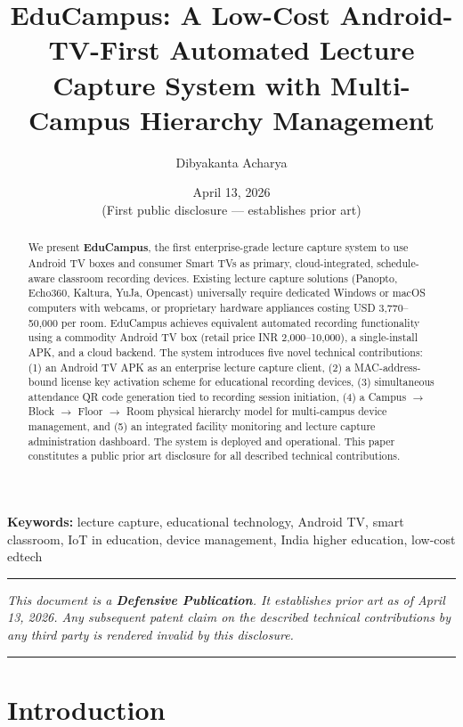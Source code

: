 \documentclass[12pt,a4paper]{article}
\title{\textbf{EduCampus: A Low-Cost Android-TV-First Automated Lecture Capture System with Multi-Campus Hierarchy Management}}
\author[1]{Dibyakanta Acharya}
\affil[1]{D\&R AI Solutions Pvt.\ Ltd., India \\
\texttt{founder@drandsolutions.in}}
\date{April 13, 2026 \\ \small{(First public disclosure — establishes prior art)}}
\begin{document}
\maketitle

\begin{abstract}
We present \textbf{EduCampus}, the first enterprise-grade lecture capture system to use Android TV boxes and consumer Smart TVs as primary, cloud-integrated, schedule-aware classroom recording devices. Existing lecture capture solutions (Panopto, Echo360, Kaltura, YuJa, Opencast) universally require dedicated Windows or macOS computers with webcams, or proprietary hardware appliances costing USD 3{,}770--50{,}000 per room. EduCampus achieves equivalent automated recording functionality using a commodity Android TV box (retail price INR 2{,}000--10{,}000), a single-install APK, and a cloud backend. The system introduces five novel technical contributions: (1) an Android TV APK as an enterprise lecture capture client, (2) a MAC-address-bound license key activation scheme for educational recording devices, (3) simultaneous attendance QR code generation tied to recording session initiation, (4) a Campus $\rightarrow$ Block $\rightarrow$ Floor $\rightarrow$ Room physical hierarchy model for multi-campus device management, and (5) an integrated facility monitoring and lecture capture administration dashboard. The system is deployed and operational. This paper constitutes a public prior art disclosure for all described technical contributions.
\end{abstract}

\textbf{Keywords:} lecture capture, educational technology, Android TV, smart classroom, IoT in education, device management, India higher education, low-cost edtech

\hrule
\vspace{0.5em}
\small\textit{This document is a \textbf{Defensive Publication}. It establishes prior art as of April 13, 2026. Any subsequent patent claim on the described technical contributions by any third party is rendered invalid by this disclosure.}
\vspace{0.5em}
\hrule

\newpage
\tableofcontents
\newpage

\section{Introduction}
\end{document}
